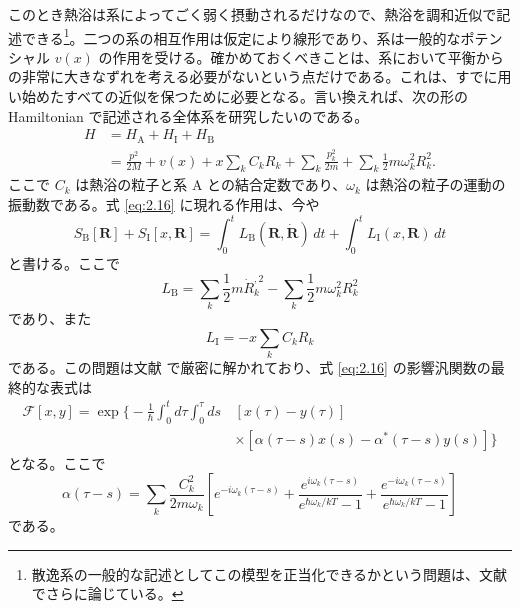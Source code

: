 このとき熱浴は系によってごく弱く摂動されるだけなので、熱浴を調和近似で記述できる\footnote{散逸系の一般的な記述としてこの模型を正当化できるかという問題は、文献 \cite{ref21} でさらに論じている。}。二つの系の相互作用は仮定により線形であり、系は一般的なポテンシャル $v(x)$ の作用を受ける。確かめておくべきことは、系において平衡からの非常に大きなずれを考える必要がないという点だけである。これは、すでに用い始めたすべての近似を保つために必要となる。言い換えれば、次の形の Hamiltonian で記述される全体系を研究したいのである。
\begin{equation}
 \begin{aligned}
 H&=H_{\mathrm A}+H_{\mathrm I}+H_{\mathrm B}\\
 &=\frac{p^2}{2M}+v(x)+x\sum_k C_kR_k
 +\sum_k\frac{p_k^2}{2m}+\sum_k\frac12m\omega_k^2R_k^2.
 \end{aligned}
 \tag{3.1}\label{eq:3.1}
\end{equation}
ここで $C_k$ は熱浴の粒子と系 A との結合定数であり、$\omega_k$ は熱浴の粒子の運動の振動数である。式 \eqref{eq:2.16} に現れる作用は、今や
\begin{equation}
 S_{\mathrm B}[\bm R]+S_{\mathrm I}[x,\bm R]
 =\int_0^t L_{\mathrm B}(\bm R,\dot{\bm R})\,dt
 +\int_0^t L_{\mathrm I}(x,\bm R)\,dt
 \tag{3.2}\label{eq:3.2}
\end{equation}
と書ける。ここで
\begin{equation}
 L_{\mathrm B}=\sum_k\frac12m\dot R_k^{,2}
 -\sum_k\frac12m\omega_k^2R_k^2
 \tag{3.3}\label{eq:3.3}
\end{equation}
であり、また
\begin{equation}
 L_{\mathrm I}=-x\sum_k C_kR_k
 \tag{3.4}\label{eq:3.4}
\end{equation}
である。この問題は文献 \cite{ref22,ref23} で厳密に解かれており、式 \eqref{eq:2.16} の影響汎関数の最終的な表式は
\begin{equation}
 \begin{aligned}
 \mathcal F[x,y]=\exp\biggl\{ -\frac1\hbar\int_0^t d\tau\int_0^\tau ds\,
 &[x(\tau)-y(\tau)]\\
 &\times[\alpha(\tau-s)x(s)-\alpha^*(\tau-s)y(s)]\biggr\}
 \end{aligned}
 \tag{3.5}\label{eq:3.5}
\end{equation}
となる。ここで
\begin{equation}
 \alpha(\tau-s)=\sum_k\frac{C_k^2}{2m\omega_k}
 \left[e^{-i\omega_k(\tau-s)}
 +\frac{e^{i\omega_k(\tau-s)}}{e^{\hbar\omega_k/kT}-1}
 +\frac{e^{-i\omega_k(\tau-s)}}{e^{\hbar\omega_k/kT}-1}\right]
 \tag{3.6}\label{eq:3.6}
\end{equation}
である。

